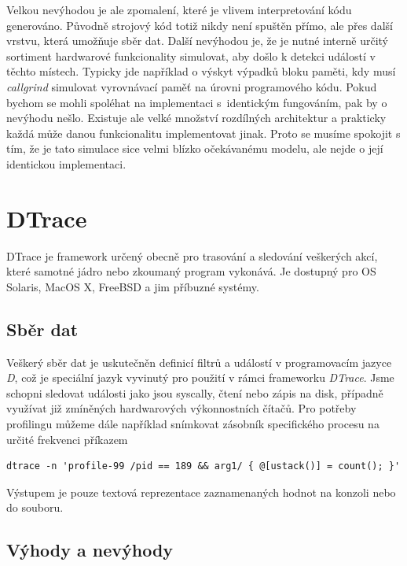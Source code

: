 \documentclass[czech,BP]{thesiskiv}
\begin{document}
Velkou nevýhodou je ale zpomalení, které je vlivem interpretování kódu generováno. Původně strojový kód totiž nikdy není spuštěn přímo, ale přes další vrstvu, která umožňuje sběr dat. Další nevýhodou je, že je nutné interně určitý sortiment hardwarové funkcionality simulovat, aby došlo k detekci událostí v těchto místech. Typicky jde například o výskyt výpadků bloku paměti, kdy musí \emph{callgrind} simulovat vyrovnávací paměť na úrovni programového kódu. Pokud bychom se mohli spoléhat na implementaci s~identickým fungováním, pak by o nevýhodu nešlo. Existuje ale velké množství rozdílných architektur a prakticky každá může danou funkcionalitu implementovat jinak. Proto se musíme spokojit s tím, že je tato simulace sice velmi blízko očekávanému modelu, ale nejde o její identickou implementaci.




\section{DTrace}

DTrace je framework určený obecně pro trasování a sledování veškerých akcí, které samotné jádro nebo zkoumaný program vykonává. Je dostupný pro OS Solaris, MacOS X, FreeBSD a jim příbuzné systémy.

\subsection*{Sběr dat}

Veškerý sběr dat je uskutečněn definicí filtrů a událostí v programovacím jazyce \emph{D}, což je speciální jazyk vyvinutý pro použití v rámci frameworku \emph{DTrace}. Jsme schopni sledovat události jako jsou syscally, čtení nebo zápis na disk, případně využívat již zmíněných hardwarových výkonnostních čítačů. Pro potřeby profilingu můžeme dále například snímkovat zásobník specifického procesu na určité frekvenci příkazem

\lstset{escapechar=@,style=custombash}
\begin{lstlisting}
dtrace -n 'profile-99 /pid == 189 && arg1/ { @[ustack()] = count(); }'
\end{lstlisting}

Výstupem je pouze textová reprezentace zaznamenaných hodnot na konzoli nebo do souboru.

\subsection*{Výhody a nevýhody}
\end{document}

